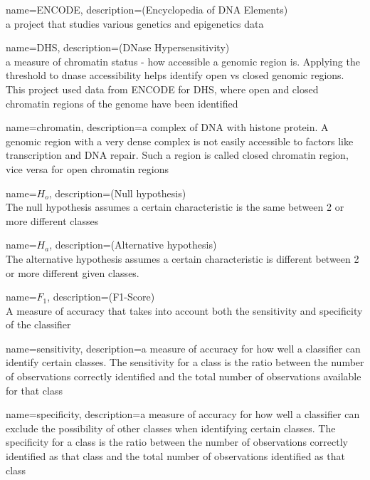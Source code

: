 {
        name=ENCODE,
        description={(Encyclopedia of DNA Elements) \\ a project that studies various genetics and epigenetics data}
}

{
        name=DHS,
        description={(DNase Hypersensitivity) \\ a measure of chromatin status - how accessible a genomic region is. Applying the threshold to dnase accessibility helps identify open vs closed genomic regions. This project used data from ENCODE for DHS, where open and closed chromatin regions of the genome have been identified}
}

{
        name=chromatin,
        description={a complex of DNA with histone protein. A genomic region with a very dense complex is not easily accessible to factors like transcription and DNA repair. Such a region is called closed chromatin region, vice versa for open chromatin regions}
}

{
        name=$H_o$,
        description={(Null hypothesis) \\ The null hypothesis assumes a certain characteristic is the same between 2 or more different classes}
}

{
        name=$H_a$,
        description={(Alternative hypothesis) \\ The alternative hypothesis assumes a certain characteristic is different between 2 or more different given classes.}
}

{
        name=$F_1$,
        description={(F1-Score) \\ A measure of accuracy that takes into account both the sensitivity and specificity of the classifier}
}

{
        name=sensitivity,
        description={a measure of accuracy for how well a classifier can identify certain classes. The sensitivity for a class is the ratio between the number of observations correctly identified and the total number of observations available for that class}
}

{
        name=specificity,
        description={a measure of accuracy for how well a classifier can exclude the possibility of other classes when identifying certain classes. The specificity for a class is the ratio between the number of observations correctly identified as that class and the total number of observations identified as that class}
}

